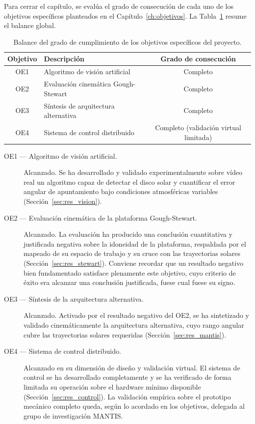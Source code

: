 Para cerrar el capítulo, se evalúa el grado de consecución de cada uno de los objetivos específicos planteados en el Capítulo~\ref{ch:objetivos}. La Tabla~\ref{tab:balance} resume el balance global.

\begin{table}[htbp]
    \centering
    \footnotesize
    \begin{tabular}{clc}
        \toprule
        \textbf{Objetivo} & \textbf{Descripción} & \textbf{Grado de consecución} \\
        \midrule
        OE1 & Algoritmo de visión artificial          & Completo \\
        OE2 & Evaluación cinemática Gough-Stewart      & Completo \\
        OE3 & Síntesis de arquitectura alternativa     & Completo \\
        OE4 & Sistema de control distribuido           & Completo (validación virtual limitada) \\
        \bottomrule
    \end{tabular}
    \caption{Balance del grado de cumplimiento de los objetivos 
    específicos del proyecto.}
    \label{tab:balance}
\end{table}

\begin{description}
\item[OE1 --- Algoritmo de visión artificial.] Alcanzado. Se ha desarrollado y validado experimentalmente sobre vídeo real un algoritmo capaz de detectar el disco solar y cuantificar el error angular de apuntamiento bajo condiciones atmosféricas variables (Sección~\ref{sec:res_vision}).

\item[OE2 --- Evaluación cinemática de la plataforma Gough-Stewart.] Alcanzado. La evaluación ha producido una conclusión cuantitativa y justificada negativa sobre la idoneidad de la plataforma, respaldada por el mapeado de su espacio de trabajo y su cruce con las trayectorias solares (Sección~\ref{sec:res_stewart}). Conviene recordar que un resultado negativo bien fundamentado satisface plenamente este objetivo, cuyo criterio de éxito era alcanzar una conclusión justificada, fuese cual fuese su signo.

\item[OE3 --- Síntesis de la arquitectura alternativa.] Alcanzado. Activado por el resultado negativo del OE2, se ha sintetizado y validado cinemáticamente la arquitectura alternativa, cuyo rango angular cubre las trayectorias solares requeridas (Sección~\ref{sec:res_mantis}).

\item[OE4 --- Sistema de control distribuido.] Alcanzado en su dimensión de diseño y validación virtual. El sistema de control se ha desarrollado completamente y se ha verificado de forma limitada su operación sobre el hardware mínimo disponible (Sección~\ref{sec:res_control}). La validación empírica sobre el prototipo mecánico completo queda, según lo acordado en los objetivos, delegada al grupo de investigación MANTIS.
\end{description}

